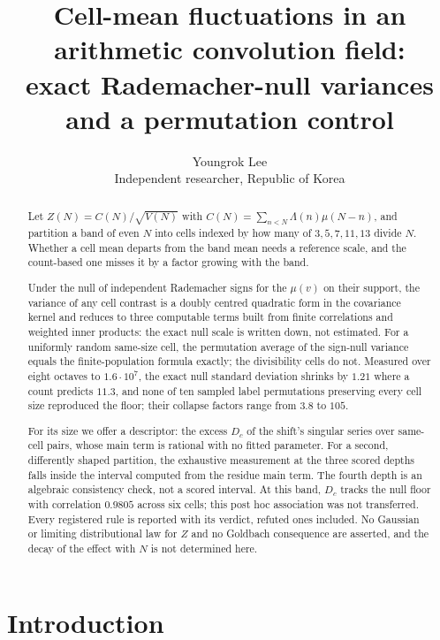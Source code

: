 \documentclass[11pt,a4paper]{article}
\title{Cell-mean fluctuations in an arithmetic convolution field:\\
exact Rademacher-null variances and a permutation control}
\author{Youngrok Lee\\
\small Independent researcher, Republic of Korea}
\date{}
\theoremstyle{plain}
\theoremstyle{definition}
\theoremstyle{remark}
\begin{document}
\maketitle

\begin{abstract}
Let $Z(N)=C(N)/\sqrt{V(N)}$ with
$C(N)=\sum_{n<N}\Lambda(n)\mu(N-n)$, and partition a band of even $N$
into cells indexed by how many of $3,5,7,11,13$ divide $N$.
Whether a
cell mean departs from the band mean needs a reference scale, and the
count-based one misses it by a factor growing with the band.

Under the null of independent Rademacher signs for the $\mu(v)$ on
their support, the variance of any cell contrast is a
doubly centred quadratic form in the covariance kernel and reduces to
three computable terms built from finite correlations and weighted
inner products: the exact null scale is written down, not estimated.
For a uniformly random same-size cell, the
permutation average of the sign-null variance equals the
finite-population formula exactly; the divisibility cells do not.
Measured over eight octaves to $1.6\cdot10^{7}$, the exact null
standard deviation shrinks by $1.21$ where a count predicts $11.3$,
and none of ten sampled label permutations preserving every cell size
reproduced the floor; their collapse factors range from $3.8$ to $105$.

For its size we offer a descriptor: the excess $D_c$ of the shift's
singular series over same-cell pairs, whose main term is rational with
no fitted parameter.
For a second, differently shaped partition, the exhaustive measurement
at the three scored depths falls inside the interval computed from the
residue main term. The fourth
depth is an algebraic consistency check, not a scored interval.
At this band, $D_c$ tracks the null floor with correlation $0.9805$
across six cells; this post hoc association was not transferred.
Every
registered rule is reported with its verdict, refuted ones included.
No Gaussian or limiting distributional law for $Z$ and no Goldbach consequence are asserted,
and the decay of the effect with $N$ is not determined here.
\end{abstract}

\section{Introduction}
\end{document}
